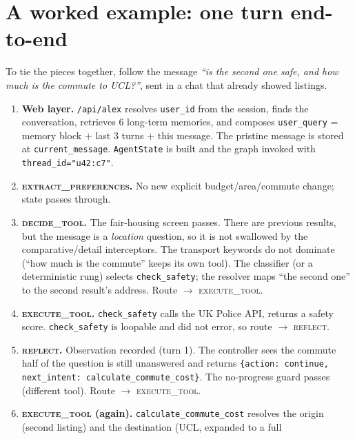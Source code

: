 \documentclass[11pt,a4paper]{article}
\newcommand{\code}[1]{\texttt{\small #1}}
\newcommand{\gnode}[1]{\textsc{#1}}  %
\begin{document}
\section{A worked example: one turn end-to-end}
\label{sec:example}

To tie the pieces together, follow the message \emph{``is the second one safe, and how
much is the commute to UCL?''}, sent in a chat that already showed listings.

\begin{enumerate}[leftmargin=1.6em,itemsep=3pt]
  \item \textbf{Web layer.} \code{/api/alex} resolves \code{user\_id} from the session,
        finds the conversation, retrieves 6 long-term memories, and composes
        \code{user\_query} = memory block $+$ last 3 turns $+$ this message. The
        pristine message is stored at \code{current\_message}. \code{AgentState} is
        built and the graph invoked with \code{thread\_id="u42:c7"}.
  \item \textbf{\gnode{extract\_preferences}.} No new explicit budget/area/commute
        change; state passes through.
  \item \textbf{\gnode{decide\_tool}.} The fair-housing screen passes. There are
        previous results, but the message is a \emph{location} question, so it is not
        swallowed by the comparative/detail interceptors. The transport keywords do
        not dominate (``how much is the commute'' keeps its own tool). The classifier
        (or a deterministic rung) selects \code{check\_safety}; the resolver maps ``the
        second one'' to the second result's address. Route $\to$ \gnode{execute\_tool}.
  \item \textbf{\gnode{execute\_tool}.} \code{check\_safety} calls the UK Police API,
        returns a safety score. \code{check\_safety} is loopable and did not error, so
        route $\to$ \gnode{reflect}.
  \item \textbf{\gnode{reflect}.} Observation recorded (turn 1). The controller sees the
        commute half of the question is still unanswered and returns
        \code{\{action: continue, next\_intent: calculate\_commute\_cost\}}. The
        no-progress guard passes (different tool). Route $\to$ \gnode{execute\_tool}.
  \item \textbf{\gnode{execute\_tool} (again).} \code{calculate\_commute\_cost} resolves
        the origin (second listing) and the destination (UCL, expanded to a full

\end{enumerate}
\end{document}
